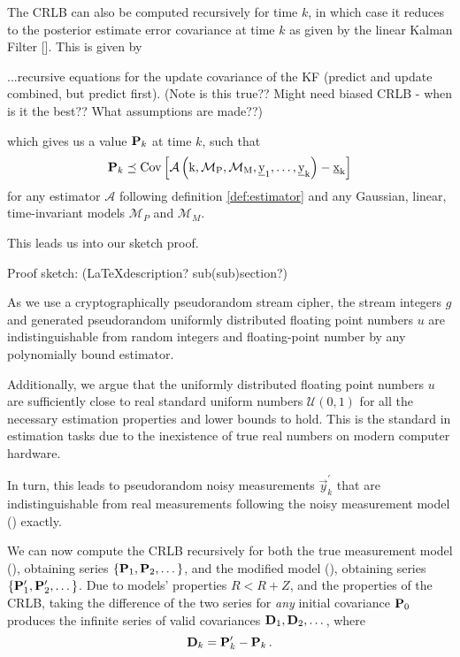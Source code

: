 \documentclass[conference]{IEEEtran}
\theoremstyle{definition}
\theoremstyle{definition}
\theoremstyle{remark}
\begin{document}
The CRLB can also be computed recursively for time $k$, in which case it reduces to the posterior estimate error covariance at time $k$ as given by the linear Kalman Filter []. This is given by

...recursive equations for the update covariance of the KF (predict and update combined, but predict first). (Note is this true?? Might need biased CRLB - when is it the best?? What assumptions are made??)

which gives us a value ${{\mathbf{P}}}_k$ at time $k$, such that
\begin{equation}
   \mat{P}_k \preceq \operatorfont{Cov}\left[\mathcal{A}\left(k, \mathcal{M}_P, \mathcal{M}_M, \vec{y}_1,\dots,\vec{y}_k\right) - \vec{x}_k \right]
\end{equation}
for any estimator $\mathcal{A}$ following definition \ref{def:estimator} and any Gaussian, linear, time-invariant models $\mathcal{M}_P$ and $\mathcal{M}_M$.

This leads us into our sketch proof.

Proof sketch: (LaTeXdescription? sub(sub)section?)

As we use a cryptographically pseudorandom stream cipher, the stream integers $g$ and generated pseudorandom uniformly distributed floating point numbers $u$ are indistinguishable from random integers and floating-point number by any polynomially bound estimator. 

Additionally, we argue that the uniformly distributed floating point numbers $u$ are sufficiently close to real standard uniform numbers $\mathcal{U}(0,1)$ for all the necessary estimation properties and lower bounds to hold. This is the standard in estimation tasks due to the inexistence of true real numbers on modern computer hardware.

In turn, this leads to pseudorandom noisy measurements $\vec{y}^\prime_k$ that are indistinguishable from real measurements following the noisy measurement model () exactly.

We can now compute the CRLB recursively for both the true measurement model (), obtaining series $\{{{\mathbf{P}}}_1,{{\mathbf{P}}}_2,\dots\}$, and the modified model (), obtaining series $\{{{\mathbf{P}}}^\prime_1,{{\mathbf{P}}}^\prime_2,\dots\}$. Due to models' properties $R<R+Z$, and the properties of the CRLB, taking the difference of the two series for \textit{any} initial covariance ${{\mathbf{P}}}_0$ produces the infinite series of valid covariances ${{\mathbf{D}}}_1,{{\mathbf{D}}}_2,\dots$, where
\begin{equation}
   {\ensuremath{{\mathbf{D}}}}_k = {{\mathbf{P}}}^\prime_k - {{\mathbf{P}}}_k\,.
\end{equation}
\end{document}
